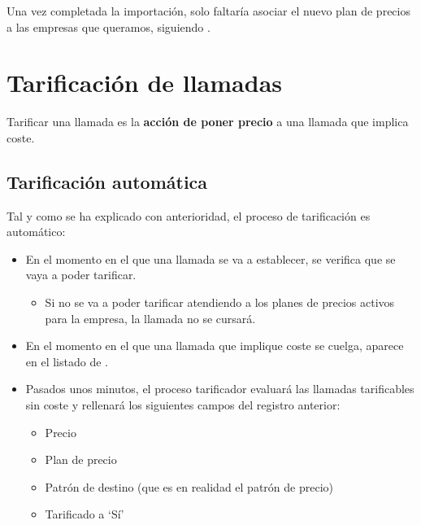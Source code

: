 \documentclass[letterpaper,10pt,spanish]{sphinxmanual}
\begin{document}
Una vez completada la importación, solo faltaría asociar el nuevo plan de precios a las empresas que queramos, siguiendo {\hyperref[external_outgoing_calls/noplan_nocall:pricing\string-plan\string-to\string-company]{}}.


\section{Tarificación de llamadas}
\label{billing_and_invoices/bill_a_call::doc}\label{billing_and_invoices/bill_a_call:call-billing}
Tarificar una llamada es la \textbf{acción de poner precio} a una llamada que implica coste.


\subsection{Tarificación automática}
\label{billing_and_invoices/bill_a_call:automatic-billing}
Tal y como se ha explicado con anterioridad, el proceso de tarificación es automático:
\begin{itemize}
\item {} 
En el momento en el que una llamada se va a establecer, se verifica que se vaya a poder tarificar.
\begin{itemize}
\item {} 
Si no se va a poder tarificar atendiendo a los planes de precios activos para la empresa, la llamada no se cursará.

\end{itemize}

\item {} 
En el momento en el que una llamada que implique coste se cuelga, aparece en el listado de {\hyperref[billing_and_invoices/billable_calls:billable\string-calls]{}}.

\item {} 
Pasados unos minutos, el proceso tarificador evaluará las llamadas tarificables sin coste y rellenará los siguientes campos del registro anterior:
\begin{itemize}
\item {} 
Precio

\item {} 
Plan de precio

\item {} 
Patrón de destino (que es en realidad el patrón de precio)

\item {} 
Tarificado a `Sí'

\end{itemize}

\end{itemize}
\end{document}
